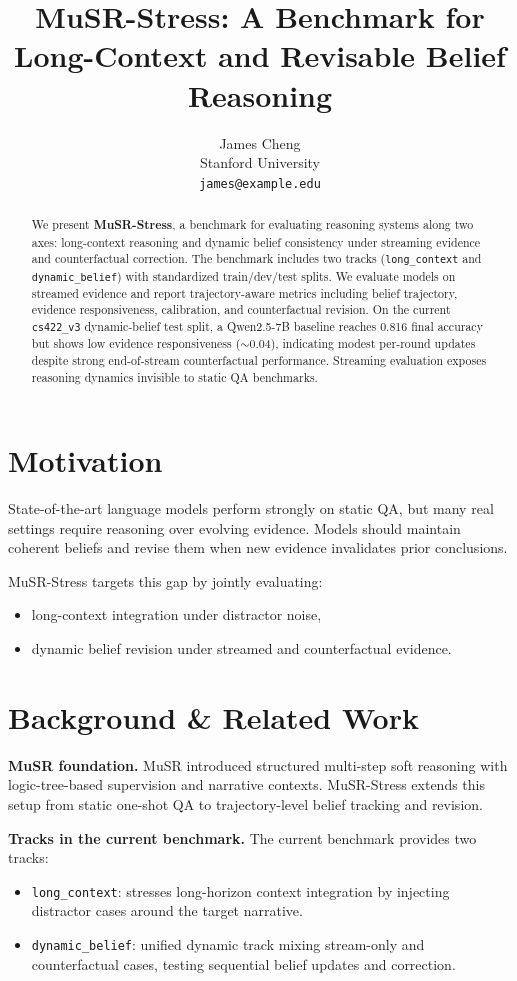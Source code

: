 \documentclass{article}
\title{MuSR-Stress: A Benchmark for Long-Context and Revisable Belief Reasoning}
\author{
James Cheng \\
Stanford University \\
\texttt{james@example.edu}
}
\begin{document}
\maketitle

\begin{abstract}
We present \textbf{MuSR-Stress}, a benchmark for evaluating reasoning systems along two axes: long-context reasoning and dynamic belief consistency under streaming evidence and counterfactual correction. The benchmark includes two tracks (\texttt{long\_context} and \texttt{dynamic\_belief}) with standardized train/dev/test splits. We evaluate models on streamed evidence and report trajectory-aware metrics including belief trajectory, evidence responsiveness, calibration, and counterfactual revision. On the current \texttt{cs422\_v3} dynamic-belief test split, a Qwen2.5-7B baseline reaches 0.816 final accuracy but shows low evidence responsiveness ($\sim$0.04), indicating modest per-round updates despite strong end-of-stream counterfactual performance. Streaming evaluation exposes reasoning dynamics invisible to static QA benchmarks.
\end{abstract}

\section{Motivation}
State-of-the-art language models perform strongly on static QA, but many real settings require reasoning over evolving evidence. Models should maintain coherent beliefs and revise them when new evidence invalidates prior conclusions.

MuSR-Stress targets this gap by jointly evaluating:
\begin{itemize}
  \item long-context integration under distractor noise,
  \item dynamic belief revision under streamed and counterfactual evidence.
\end{itemize}

\section{Background \& Related Work}
\textbf{MuSR foundation.}
MuSR introduced structured multi-step soft reasoning with logic-tree-based supervision and narrative contexts. MuSR-Stress extends this setup from static one-shot QA to trajectory-level belief tracking and revision.

\textbf{Tracks in the current benchmark.}
The current benchmark provides two tracks:
\begin{itemize}
  \item \texttt{long\_context}: stresses long-horizon context integration by injecting distractor cases around the target narrative.
  \item \texttt{dynamic\_belief}: unified dynamic track mixing stream-only and counterfactual cases, testing sequential belief updates and correction.
\end{itemize}
\end{document}
